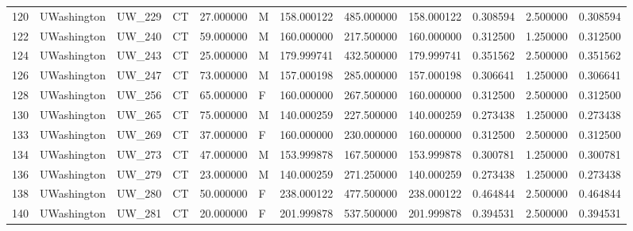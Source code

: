 \begin{tabular}{llllrlrrrrrr}
120    &     UWashington &       UW\_229 &                 CT &  27.000000 &        M &       158.000122 &    485.000000 &  158.000122 &               0.308594 &            2.500000 &          0.308594 \\
122    &     UWashington &       UW\_240 &                 CT &  59.000000 &        M &       160.000000 &    217.500000 &  160.000000 &               0.312500 &            1.250000 &          0.312500 \\
124    &     UWashington &       UW\_243 &                 CT &  25.000000 &        M &       179.999741 &    432.500000 &  179.999741 &               0.351562 &            2.500000 &          0.351562 \\
126    &     UWashington &       UW\_247 &                 CT &  73.000000 &        M &       157.000198 &    285.000000 &  157.000198 &               0.306641 &            1.250000 &          0.306641 \\
128    &     UWashington &       UW\_256 &                 CT &  65.000000 &        F &       160.000000 &    267.500000 &  160.000000 &               0.312500 &            2.500000 &          0.312500 \\
130    &     UWashington &       UW\_265 &                 CT &  75.000000 &        M &       140.000259 &    227.500000 &  140.000259 &               0.273438 &            1.250000 &          0.273438 \\
133    &     UWashington &       UW\_269 &                 CT &  37.000000 &        F &       160.000000 &    230.000000 &  160.000000 &               0.312500 &            2.500000 &          0.312500 \\
134    &     UWashington &       UW\_273 &                 CT &  47.000000 &        M &       153.999878 &    167.500000 &  153.999878 &               0.300781 &            1.250000 &          0.300781 \\
136    &     UWashington &       UW\_279 &                 CT &  23.000000 &        M &       140.000259 &    271.250000 &  140.000259 &               0.273438 &            1.250000 &          0.273438 \\
138    &     UWashington &       UW\_280 &                 CT &  50.000000 &        F &       238.000122 &    477.500000 &  238.000122 &               0.464844 &            2.500000 &          0.464844 \\
140    &     UWashington &       UW\_281 &                 CT &  20.000000 &        F &       201.999878 &    537.500000 &  201.999878 &               0.394531 &            2.500000 &          0.394531 \\

\end{tabular}

